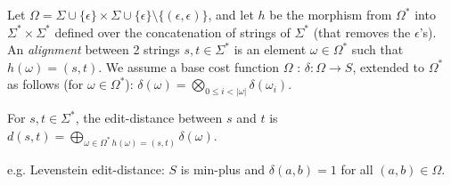 \documentclass[runningheads]{llncs}
\begin{document}
Let $\Omega = \Sigma \cup \{ \epsilon \} \times \Sigma \cup \{ \epsilon \} \setminus \{ (\epsilon, \epsilon) \}$,
and let $h$ be the morphism from $\Omega^*$ into $\Sigma^* \times \Sigma^*$  
defined over the concatenation of strings of $\Sigma^*$ (that removes the $\epsilon$'s).
%
\noindent
An \emph{alignment} between 2 strings  $s, t \in \Sigma^*$ is an element $\omega \in \Omega^*$ 
such that $h(\omega) = (s, t)$.
%
\noindent
We assume a base cost function $\Omega$ : $\delta: \Omega \to S$, extended to $\Omega^*$ as follows  
(for $\omega \in \Omega^*$): 
\(
\displaystyle\delta(\omega) = \bigotimes_{0 \leq i < |\omega|} \delta(\omega_i)
\).

\noindent
\begin{definition}
For  $s, t \in \Sigma^*$, the edit-distance between $s$ and $t$ is  
\( 
d(s, t) = \displaystyle\bigoplus_{\omega \in \Omega^*\, h(\omega) = (s, t)} \delta(\omega)
\).
\end{definition}

e.g. Levenstein edit-distance: $S$ is min-plus and $\delta(a, b) = 1$ for all $(a, b) \in \Omega$.


\end{document}
